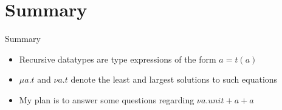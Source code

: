 \documentclass{beamer}
\begin{document}
\section*{Summary}

\begin{frame}{Summary}

  \begin{itemize}
  \item
    Recursive datatypes are type expressions of the form $a = t(a)$
  \item
    $\mu a . t$ and $\nu a . t$ denote the least and largest solutions to such
    equations
  \item
    My plan is to answer some questions regarding $\nu a . unit + a + a$
  \end{itemize}

\end{frame}
\end{document}
